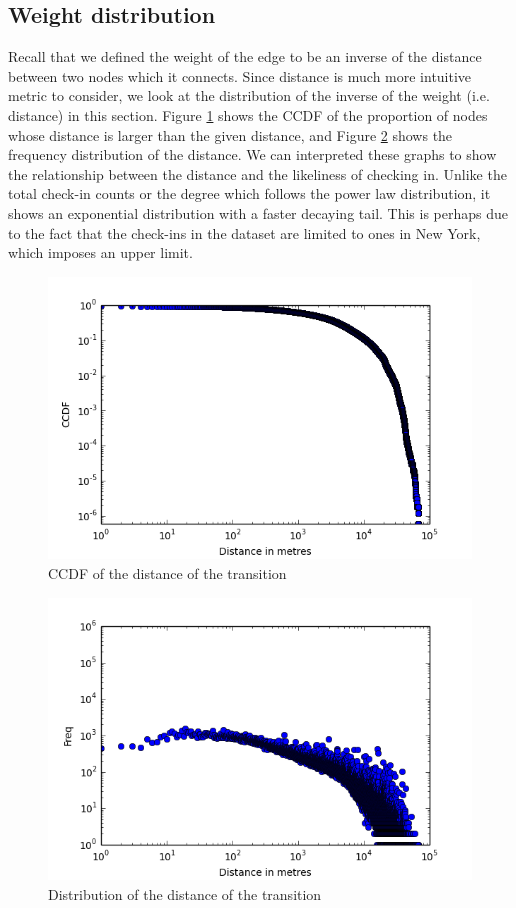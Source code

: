 \subsection{Weight distribution}
Recall that we defined the weight of the edge to be an inverse of the distance between two nodes which it connects.
Since distance is much more intuitive metric to consider, we look at the distribution of the inverse of the weight (i.e. distance) in this section.
Figure \ref{fig:distance-ccdf} shows the CCDF of the proportion of nodes whose distance is larger than the given distance, and Figure \ref{fig:distance-distribution} shows the frequency distribution of the distance.
\color{red} We can interpreted these graphs to show the relationship between the distance and the likeliness of checking in. \color{black}
Unlike the total check-in counts or the degree which follows the power law distribution, it shows an exponential distribution with a faster decaying tail.
This is perhaps due to the fact that the check-ins in the dataset are limited to ones in New York, which imposes an upper limit.
\begin{figure}
\centering
\includegraphics[scale=0.5]{../distance_metres_ccdf.png}
\caption{CCDF of the distance of the transition}
\label{fig:distance-ccdf}
\end{figure}
\begin{figure}
\centering
\includegraphics[scale=0.5]{../distance_metres_distribution.png}
\caption{Distribution of the distance of the transition}
\label{fig:distance-distribution}
\end{figure}
